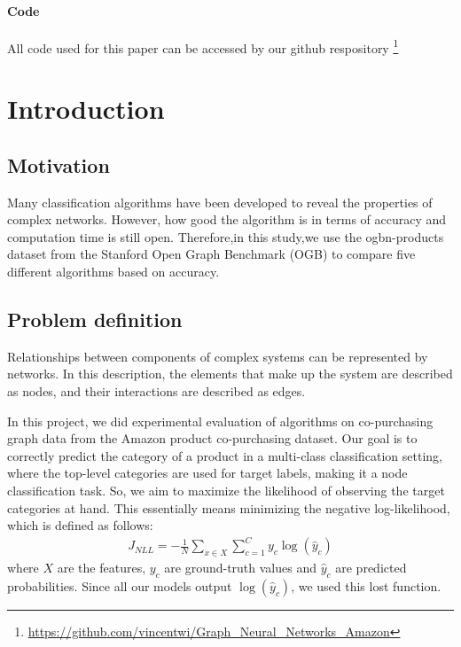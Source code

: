 \documentclass[sigconf, nonacm]{acmart}
\begin{document}
\paragraph{\textbf{Code}}
All code used for this paper can be accessed by our github respository \footnote{ \href{https://github.com/vincentwi/Graph_Neural_Networks_Amazon}{https://github.com/vincentwi/Graph\_Neural\_Networks\_Amazon}}

\section*{Introduction}
\subsection*{Motivation}

Many classification algorithms have been developed to reveal the  properties of complex networks. However, how good the algorithm is in terms of accuracy and computation time is still open. Therefore,in this study,we use the ogbn-products dataset from the Stanford Open Graph Benchmark (OGB)
\cite{hu2020ogb} to compare five different algorithms based on accuracy.

\subsection*{Problem definition}

Relationships between components of complex systems can be represented by networks. In this description, the elements that make up the system are described as nodes, and their interactions are described as edges.

In this project, we did experimental evaluation of algorithms on co-purchasing graph data from the Amazon product co-purchasing dataset. Our goal is to correctly predict the category of a product in a multi-class classification setting, where the top-level categories are used for target labels, making it a node classification task. So, we aim to maximize the likelihood of observing the target categories at hand. This essentially means minimizing the negative log-likelihood, which is defined as follows:
\begin{align}
J_{NLL} = - \frac{1}{N} \sum_{x \in X} \sum_{c=1}^{C} y_c \log \left(\hat y_c \right)
\end{align}
where $X$ are the features, $y_c$ are ground-truth values and $\hat y_c$ are predicted probabilities. Since all our models output $\log \left(\hat y_c \right)$, we used this lost function.
\end{document}
